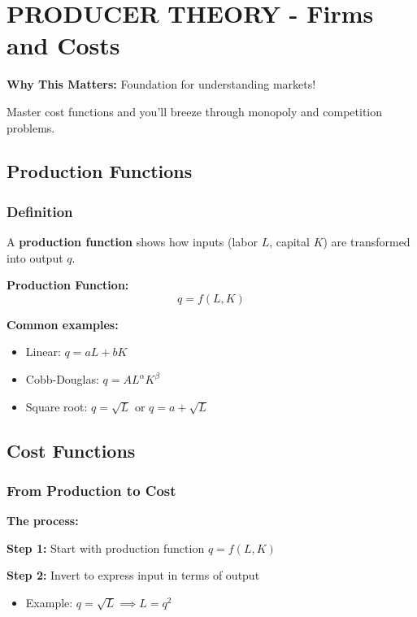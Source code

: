 \documentclass[10pt,letterpaper]{article}
\begin{document}
\newpage

\section{PRODUCER THEORY - Firms and Costs}

\begin{criticalbox}
\textbf{Why This Matters:} Foundation for understanding markets!

Master cost functions and you'll breeze through monopoly and competition problems.
\end{criticalbox}

\subsection{Production Functions}

\subsubsection{Definition}

A \textbf{production function} shows how inputs (labor $L$, capital $K$) are transformed into output $q$.

\begin{formulabox}
\textbf{Production Function:}
\[
\boxed{q = f(L, K)}
\]

\textbf{Common examples:}
\begin{itemize}
  \item Linear: $q = aL + bK$
  \item Cobb-Douglas: $q = AL^\alpha K^\beta$
  \item Square root: $q = \sqrt{L}$ or $q = a + \sqrt{L}$
\end{itemize}
\end{formulabox}

\subsection{Cost Functions}

\subsubsection{From Production to Cost}

\textbf{The process:}

\textbf{Step 1:} Start with production function $q = f(L, K)$

\textbf{Step 2:} Invert to express input in terms of output
\begin{itemize}
  \item Example: $q = \sqrt{L} \implies L = q^2$
\end{itemize}
\end{document}
